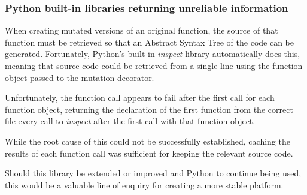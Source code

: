 \subsubsection{Python built-in libraries returning unreliable information}
When creating mutated versions of an original function, the source of that function must be retrieved so that an Abstract Syntax Tree of the code can be generated. Fortunately, Python's built in \emph{inspect} library automatically does this, meaning that source code could be retrieved from a single line using the function object passed to the mutation decorator. \par
Unfortunately, the function call appears to fail after the first call for each function object, returning the declaration of the first function from the correct file every call to \emph{inspect} after the first call with that function object. \par
While the root cause of this could not be successfully established, caching the results of each function call was sufficient for keeping the relevant source code. \par
Should this library be extended or improved and Python to continue being used, this would be a valuable line of enquiry for creating a more stable platform.\par